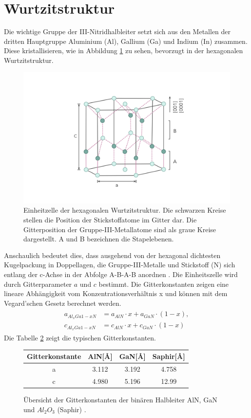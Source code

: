 \section{Wurtzitstruktur}
Die wichtige Gruppe der III-Nitridhalbleiter setzt sich aus den Metallen
der dritten Hauptgruppe Aluminium (Al), Gallium (Ga) und Indium (In) zusammen.
Diese kristallisieren, wie in Abbildung \ref{fig:wurtz} zu sehen, bevorzugt in der hexagonalen Wurtzitstruktur.
\begin{figure}[!htb]
    \centering
    \begin{minipage}[t]{\linewidth}
        \centering
        \includegraphics[width=0.8\linewidth]{Bilder/Wurtzite.png}
    \end{minipage}%
     \caption{Einheitzelle der hexagonalen Wurtzitstruktur. Die schwarzen Kreise stellen die Position der Stickstoffatome im Gitter dar. Die Gitterposition der Gruppe-III-Metallatome sind als graue Kreise dargestellt. A und B bezeichnen die Stapelebenen.}
        \label{fig:wurtz}
\end{figure}
\noindent
Anschaulich bedeutet dies, dass ausgehend von der hexagonal dichtesten Kugelpackung in Doppellagen, die Gruppe-III-Metalle und Stickstoff (N) sich entlang der c-Achse in der Abfolge A-B-A-B anordnen \cite{buchc}. Die Einheitszelle wird durch Gitterparameter $a$ und $c$ bestimmt. Die Gitterkonstanten zeigen eine lineare Abhängigkeit vom Konzentrationsverhältnis x und können mit dem Vegard'schen Gesetz berechnet werden.
%
\begin{align}
\begin{split}
    a_{Al_{x}Ga{1-x}N} &= a_{AlN} \cdot x + a_{GaN} \cdot (1-x)  ,
    \\
    c_{Al_{x}Ga{1-x}N} &= c_{AlN} \cdot x + c_{GaN} \cdot (1-x) 
\end{split}
\end{align}
%
Die Tabelle \ref{table:tab1} zeigt die typischen Gitterkonstanten.
\begin{figure}[H]
\centering
\begin{tabular}{|c|c|c|c|}
\hline
\multicolumn{1}{|l|}{Gitterkonstante} & AlN[\AA] & GaN[\AA] & Saphir[\AA] \\ \hline \hline
a & 3.112 & 3.192 & 4.758 \\ \hline
c & 4.980 & 5.196 & 12.99 \\ \hline
\end{tabular}
\caption{Übersicht der Gitterkonstanten der binären Halbleiter AlN, GaN und $Al_{2}O_{3}$ (Saphir) \cite{pohl}. }
\label{table:tab1}
\end{figure}

